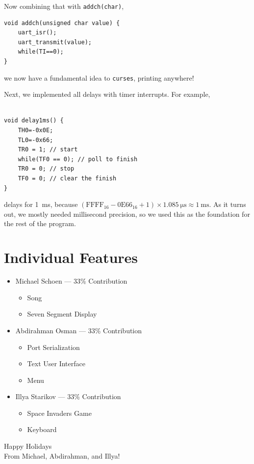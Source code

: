 \documentclass[12pt]{article}
\newcommand{\shellcmd}[1]{\texttt{\colorbox{gray!30}{#1}}}
\begin{document}
\noindent Now combining that with \shellcmd{addch(char)},

\begin{lstlisting}[style=cC]
void addch(unsigned char value) {
	uart_isr();
	uart_transmit(value);
	while(TI==0);
}
\end{lstlisting}

\noindent we now have a fundamental idea to \shellcmd{curses}, printing anywhere!

Next, we implemented all delays with timer interrupts. For example,

\begin{lstlisting}[style=cC]

void delay1ms() {
	TH0=-0x0E;
    TL0=-0x66;
	TR0 = 1; // start
	while(TF0 == 0); // poll to finish
	TR0 = 0; // stop
	TF0 = 0; // clear the finish
}
\end{lstlisting}

\noindent delays for \SI{1}{\milli\second}, because $(\text{FFFF}_{16} - \text{0E66}_{16} + 1)\times\SI{1.085}{\micro\second} \approx \SI{1}{\milli\second}$. As it turns out, we mostly needed millisecond precision, so we used this as the foundation for the rest of the program.

\section{Individual Features}
\begin{itemize}
    \item Michael Schoen --- 33\% Contribution
    \begin{itemize}
        \item Song
        \item Seven Segment Display
    \end{itemize}

    \item Abdirahman Osman --- 33\% Contribution
    \begin{itemize}
        \item Port Serialization
        \item Text User Interface
        \item Menu
    \end{itemize}

    \item Illya Starikov --- 33\% Contribution
    \begin{itemize}
        \item Space Invaders Game
        \item Keyboard
    \end{itemize}
\end{itemize}

\centering
\Huge Happy Holidays \\ From Michael, Abdirahman, and Illya!
\end{document}
